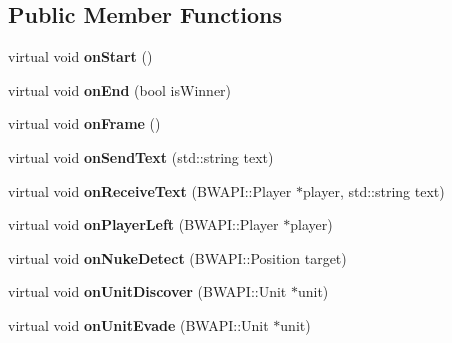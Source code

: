 \subsection*{Public Member Functions}
\begin{DoxyCompactItemize}
\item 
\hypertarget{class_b_t_h_a_i_module_af5fb346f264b5f0936353ebb94c0c798}{virtual void {\bfseries on\-Start} ()}\label{class_b_t_h_a_i_module_af5fb346f264b5f0936353ebb94c0c798}

\item 
\hypertarget{class_b_t_h_a_i_module_aad2ed0b8111d2a6d7d20d0510703bad2}{virtual void {\bfseries on\-End} (bool is\-Winner)}\label{class_b_t_h_a_i_module_aad2ed0b8111d2a6d7d20d0510703bad2}

\item 
\hypertarget{class_b_t_h_a_i_module_a89dde167216c50b2264715f9a14917a7}{virtual void {\bfseries on\-Frame} ()}\label{class_b_t_h_a_i_module_a89dde167216c50b2264715f9a14917a7}

\item 
\hypertarget{class_b_t_h_a_i_module_a98cfe95b678cbd523eb037d2cc2b277f}{virtual void {\bfseries on\-Send\-Text} (std\-::string text)}\label{class_b_t_h_a_i_module_a98cfe95b678cbd523eb037d2cc2b277f}

\item 
\hypertarget{class_b_t_h_a_i_module_a568cf07544d4b08b69c50455ac979738}{virtual void {\bfseries on\-Receive\-Text} (B\-W\-A\-P\-I\-::\-Player $\ast$player, std\-::string text)}\label{class_b_t_h_a_i_module_a568cf07544d4b08b69c50455ac979738}

\item 
\hypertarget{class_b_t_h_a_i_module_adca2b856bc47e4fad206e63f3c5b5b95}{virtual void {\bfseries on\-Player\-Left} (B\-W\-A\-P\-I\-::\-Player $\ast$player)}\label{class_b_t_h_a_i_module_adca2b856bc47e4fad206e63f3c5b5b95}

\item 
\hypertarget{class_b_t_h_a_i_module_a1ce060e965dd3ba49745fcb5d2542b7d}{virtual void {\bfseries on\-Nuke\-Detect} (B\-W\-A\-P\-I\-::\-Position target)}\label{class_b_t_h_a_i_module_a1ce060e965dd3ba49745fcb5d2542b7d}

\item 
\hypertarget{class_b_t_h_a_i_module_a02258928a60125550583eef7be995efb}{virtual void {\bfseries on\-Unit\-Discover} (B\-W\-A\-P\-I\-::\-Unit $\ast$unit)}\label{class_b_t_h_a_i_module_a02258928a60125550583eef7be995efb}

\item 
\hypertarget{class_b_t_h_a_i_module_a4bfd3ebb5b08228838b27ddf39b5b8fb}{virtual void {\bfseries on\-Unit\-Evade} (B\-W\-A\-P\-I\-::\-Unit $\ast$unit)}\label{class_b_t_h_a_i_module_a4bfd3ebb5b08228838b27ddf39b5b8fb}


\end{DoxyCompactItemize}
